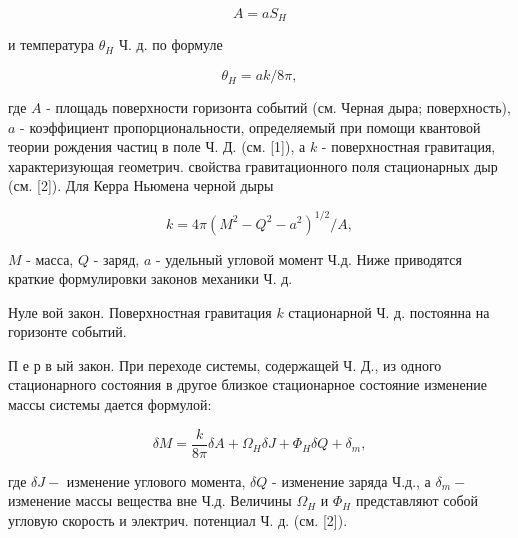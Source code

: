 \documentclass[10pt]{article}
\begin{document}
\[

A=a S_{H}

\]



и температура $\theta_{H}$ Ч. д. по формуле



\[

\theta_{H}=a k / 8 \pi,

\]



где $A$ - площадь поверхности горизонта событий (см. Черная дыра; поверхность), $a$ - коэффициент пропорциональности, определяемый при помощи квантовой теории рождения частиц в поле Ч. Д. (см. [1]), а $k$ - поверхностная гравитация, характеризующая геометрич. свойства гравитационного поля стационарных дыр (см. [2]). Для Керра Ньюмена черной дыры



\[

k=4 \pi\left(M^{2}-Q^{2}-a^{2}\right)^{1 / 2} / A,

\]



$M$ - масса, $Q$ - заряд, $a$ - удельный угловой момент Ч.д. Ниже приводятся краткие формулировки законов механики Ч. д.



Нуле вой закон. Поверхностная гравитация $k$ стационарной Ч. д. постоянна на горизонте событий.



П е р в ый закон. При переходе системы, содержащей Ч. Д., из одного стационарного состояния в другое близкое стационарное состояние изменение массы системы дается формулой:



\[

\delta M=\frac{k}{8 \pi} \delta A+\Omega_{H} \delta J+\Phi_{H} \delta Q+\delta_{m},

\]



где $\delta J-$ изменение углового момента, $\delta Q$ - изменение заряда Ч.д., а $\delta_{m}-$ изменение массы вещества вне Ч.д. Величины $\Omega_{H}$ и $\Phi_{H}$ представляют собой угловую скорость и электрич. потенциал Ч. д. (см. [2]).
\end{document}
